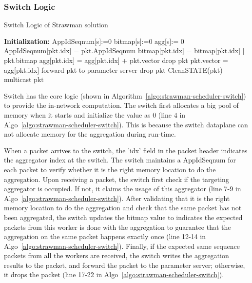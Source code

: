 \subsubsection{Switch Logic}
\begin{algorithm}[ht!]
    \caption{ Switch Logic of Strawman solution}
    \begin{algorithmic}[1]
        \STATE \textbf{Initialization:}
		\STATE AppIdSeqnum[s]:={0}
		\STATE bitmap[s]:={0}
		\STATE agg[s]:= {0} 
        \vspace{4mm}
		\STATE AppIdSeqnum[pkt.idx] = pkt.AppIdSeqnum
		\ENDIF
		\STATE bitmap[pkt.idx] = bitmap[pkt.idx] | pkt.bitmap
		\STATE	agg[pkt.idx] = agg[pkt.idx] + pkt.vector
		\ELSE
		\STATE drop pkt
		\ENDIF
		\STATE  pkt.vector = agg[pkt.idx]
		\STATE  forward pkt to parameter server
		\ELSE
		\STATE drop pkt
        \ENDIF
		\ENDIF
		\ELSE
		\STATE CleanSTATE(pkt)
		\STATE multicast pkt
		\ENDIF
	\end{algorithmic}
    \label{algo:strawman-scheduler-switch}
    \end{algorithm}
Switch has the core logic (shown in Algorithm~\ref{algo:strawman-scheduler-switch}) to provide the in-network computation.
The switch first allocates a big pool of memory when it starts and initialize 
the value as $0$ (line $4$ in Algo~\ref{algo:strawman-scheduler-switch}). This is because the switch dataplane can not 
allocate memory for the aggregation during run-time.

When a packet arrives to the switch, the 'idx' field in the packet header indicates the aggregator index at the switch.
The switch maintains a AppIdSeqnum for each packet to verify whether it is the right memory location to do the aggregation. 
Upon receiving a \system packet, the switch first check if the targeting aggregator is occupied. 
If not, it claims the usage of this aggregator (line 7-9 in Algo~\ref{algo:strawman-scheduler-switch}).
After validating that it is the right memory location to do the aggregation and check that the same packet has not been aggregated,
the switch updates the bitmap value to indicates the expected packets from this worker is done with the aggregation to guarantee
that the aggregation on the same packet happens exactly once (line 12-14 in Algo~\ref{algo:strawman-scheduler-switch}).
Finally, if the expected same sequence packets from all the workers are received, the switch writes the aggregation
results to the packet, and forward the packet to the parameter server; otherwise, it drops the packet (line 17-22 in Algo~\ref{algo:strawman-scheduler-switch}).

